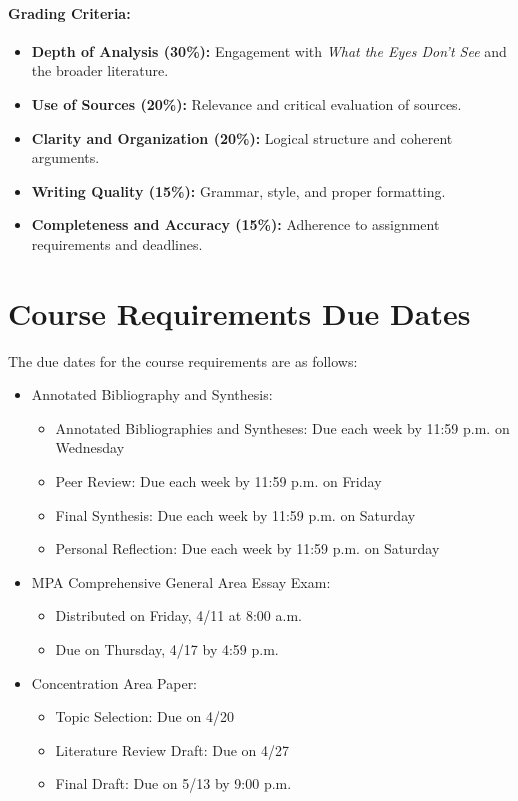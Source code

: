 \documentclass[11pt, letterpaper]{article}
\begin{document}
\paragraph*{Grading Criteria:}
\begin{itemize}
    \item \textbf{Depth of Analysis (30\%):} Engagement with \textit{What the Eyes Don’t See} and the broader literature.
    \item \textbf{Use of Sources (20\%):} Relevance and critical evaluation of sources.
    \item \textbf{Clarity and Organization (20\%):} Logical structure and coherent arguments.
    \item \textbf{Writing Quality (15\%):} Grammar, style, and proper formatting.
    \item \textbf{Completeness and Accuracy (15\%):} Adherence to assignment requirements and deadlines.
\end{itemize}


\section{Course Requirements Due Dates}

The due dates for the course requirements are as follows:
    \begin{itemize}
        \item Annotated Bibliography and Synthesis: 
        \begin{itemize}
            \item Annotated Bibliographies and Syntheses: Due each week by 11:59 p.m. on Wednesday
            \item Peer Review: Due each week by 11:59 p.m. on Friday
            \item Final Synthesis: Due each week by 11:59 p.m. on Saturday
            \item Personal Reflection: Due each week by 11:59 p.m. on Saturday
        \end{itemize}
        \item MPA Comprehensive General Area Essay Exam:
        \begin{itemize}
            \item Distributed on Friday, 4/11 at 8:00 a.m.
            \item Due on Thursday, 4/17 by 4:59 p.m.
        \end{itemize}
        \item Concentration Area Paper:
        \begin{itemize}
            \item Topic Selection: Due on 4/20
            \item Literature Review Draft: Due on 4/27
            \item Final Draft: Due on 5/13 by 9:00 p.m.
        \end{itemize}
    \end{itemize}
\end{document}
